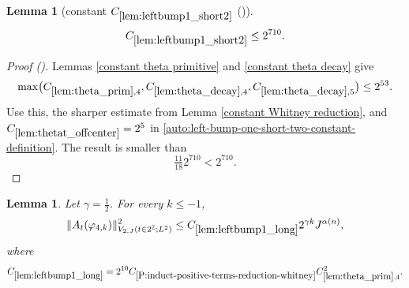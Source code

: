 \documentclass[12pt,reqno]{amsart}
\newcommand{\auto}{{({\tiny\faCar})}}
\theoremstyle{plain}
\newtheorem{lemma}[theorem]{Lemma}
\numberwithin{equation}{section}
\theoremstyle{remark}
\newcommand{\using}[1]{}
\begin{document}
\begin{lemma}[constant $C_{\ref{lem:leftbump1_short2}}$ \auto]\label{constant left bump one short two}\using{constant theta primitive}\using{constant theta decay}\using{lem:theta_prim}\using{lem:theta_decay}\using{constant Whitney reduction}\using{lem:thetat_offcenter}\using{lem:leftbump1_short2}
\begin{equation}\label{constant left bump one short two bound}
C_{\ref{lem:leftbump1_short2}}\le2^{710}.
\end{equation}
\end{lemma}
\begin{proof}[Proof \auto]
Lemmas \ref{constant theta primitive} and \ref{constant theta decay} give
\[
\max\bigl(C_{\ref{lem:theta_prim},4},C_{\ref{lem:theta_decay},4},C_{\ref{lem:theta_decay},5}\bigr)
\le2^{53}.
\]
Use this, the sharper estimate from Lemma \ref{constant Whitney reduction}, and $C_{\ref{lem:thetat_offcenter}}=2^5$ in \eqref{auto:left-bump-one-short-two-constant-definition}. The result is smaller than
\[
\tfrac{11}{18}2^{710}<2^{710}.
\]
\end{proof}


\begin{lemma}\label{lem:leftbump1_long}\using{lem:bootstrap}\using{A to Lambda}\using{lem:theta_prim}\using{P:induct-positive-terms-reduction-whitney}\using{lem:phi4_supp}\using{lem:form_pos}\using{lem:thetat_offcenter}\using{P:induct-positive-terms-reduction-whitney-gap}
Let $\gamma=\frac12$. For every $k\le-1$,
\begin{equation}\label{auto:left-bump-one-long-bound}
\|A_t(\varphi_{4,k})\|_{V_{2,J}(t\in2^\mathbb Z;L^2)}^2
\le C_{\ref{lem:leftbump1_long}}2^{\gamma k}J^{\alpha(n)},
\end{equation}
where
\begin{equation}\label{auto:left-bump-one-long-constant-definition}
C_{\ref{lem:leftbump1_long}}
=2^{10}C_{\ref{P:induct-positive-terms-reduction-whitney}}C_{\ref{lem:theta_prim},4}^2.
\end{equation}
\end{lemma}
\end{document}
